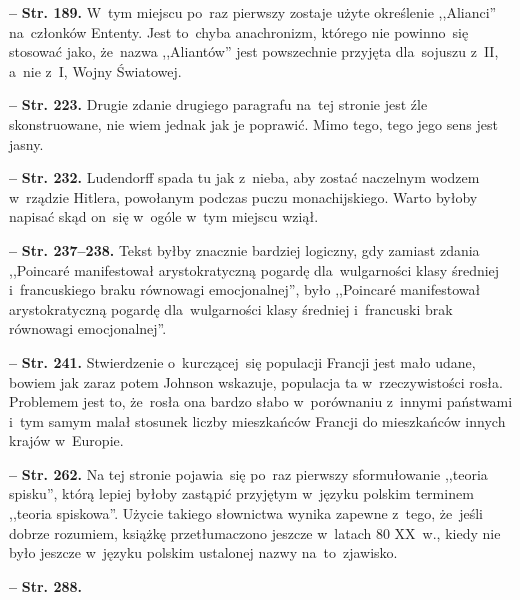 \documentclass[a4paper,11pt]{article}  %
\newcommand{\spaceFour}{0.5em}
\newcommand{\tb}{\textbf}
\newcommand{\noi}{\noindent}
\newcommand{\start}{\noi \tb{--} {}}
\newcommand{\Str}[1]{\tb{Str. #1.}}
\begin{document}
\start \Str{189} W~tym miejscu po~raz pierwszy zostaje użyte
określenie ,,Alianci'' na~członków Ententy. Jest to~chyba anachronizm,
którego nie powinno~się stosować jako, że~nazwa ,,Aliantów'' jest
powszechnie przyjęta dla~sojuszu z~II, a~nie z~I, Wojny Światowej.

\vspace{\spaceFour}


\start \Str{223} Drugie zdanie drugiego paragrafu na~tej stronie jest
źle skonstruowane, nie wiem jednak jak je poprawić. Mimo tego, tego
jego sens jest jasny.

\vspace{\spaceFour}


\start \Str{232} Ludendorff spada tu jak z~nieba, aby zostać naczelnym
wodzem w~rządzie Hitlera, powołanym podczas puczu monachijskiego.
Warto byłoby napisać skąd on~się w~ogóle w~tym miejscu wziął.

\vspace{\spaceFour}


\start \Str{237--238} Tekst byłby znacznie bardziej logiczny, gdy
zamiast zdania ,,Poincar\'{e} manifestował arystokratyczną pogardę
dla~wulgarności klasy średniej i~francuskiego braku równowagi
emocjonalnej'', było ,,Poincar\'{e} manifestował arystokratyczną
pogardę dla~wulgarności klasy średniej i~francuski brak równowagi
emocjonalnej''.

\vspace{\spaceFour}


\start \Str{241} Stwierdzenie o~kurczącej~się populacji Francji jest
mało udane, bowiem jak zaraz potem Johnson wskazuje, populacja ta
w~rzeczywistości rosła. Problemem jest to, że~rosła ona bardzo słabo
w~porównaniu z~innymi państwami i~tym samym malał stosunek liczby
mieszkańców Francji do mieszkańców innych krajów w~Europie.

\vspace{\spaceFour}


\start \Str{262} Na tej stronie pojawia~się po~raz pierwszy
sformułowanie ,,teoria spisku'', którą lepiej byłoby zastąpić
przyjętym w~języku polskim terminem ,,teoria spiskowa''. Użycie
takiego słownictwa wynika zapewne z~tego, że~jeśli dobrze rozumiem,
książkę przetłumaczono jeszcze w~latach 80 XX~w., kiedy nie było
jeszcze w~języku polskim ustalonej nazwy na~to~zjawisko.

\vspace{\spaceFour}


\start \Str{288}

\vspace{\spaceFour}
\end{document}
